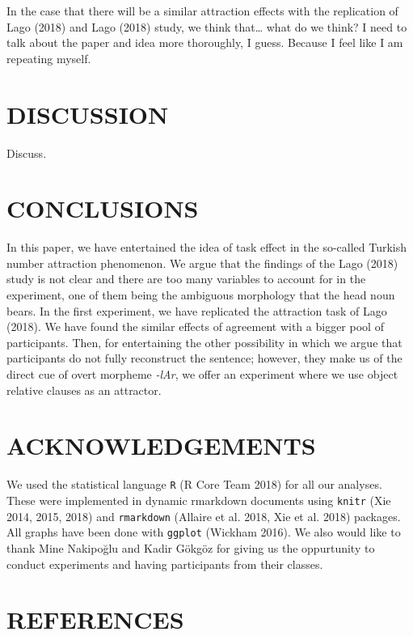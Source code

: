 \documentclass[11pt,a4paper]{article}
\begin{document}
In the case that there will be a similar attraction effects with the
replication of Lago (2018) and Lago (2018) study, we think that\ldots{}
what do we think? I need to talk about the paper and idea more
thoroughly, I guess. Because I feel like I am repeating myself.

\hypertarget{discussion}{%
\section{DISCUSSION}\label{discussion}}

Discuss.

\hypertarget{conclusions}{%
\section{CONCLUSIONS}\label{conclusions}}

In this paper, we have entertained the idea of task effect in the
so-called Turkish number attraction phenomenon. We argue that the
findings of the Lago (2018) study is not clear and there are too many
variables to account for in the experiment, one of them being the
ambiguous morphology that the head noun bears. In the first experiment,
we have replicated the attraction task of Lago (2018). We have found the
similar effects of agreement with a bigger pool of participants. Then,
for entertaining the other possibility in which we argue that
participants do not fully reconstruct the sentence; however, they make
us of the direct cue of overt morpheme \emph{-lAr}, we offer an
experiment where we use object relative clauses as an attractor.

\hypertarget{acknowledgements}{%
\section{ACKNOWLEDGEMENTS}\label{acknowledgements}}

We used the statistical language \texttt{R} (R Core Team 2018) for all
our analyses. These were implemented in dynamic rmarkdown documents
using \texttt{knitr} (Xie 2014, 2015, 2018) and \texttt{rmarkdown}
(Allaire et al. 2018, Xie et al. 2018) packages. All graphs have been
done with \texttt{ggplot} (Wickham 2016). We also would like to thank
Mine Nakipo\u{g}lu and Kadir Gökgöz for giving us the oppurtunity to
conduct experiments and having participants from their classes.

\hypertarget{references}{%
\section{REFERENCES}\label{references}}
\end{document}
